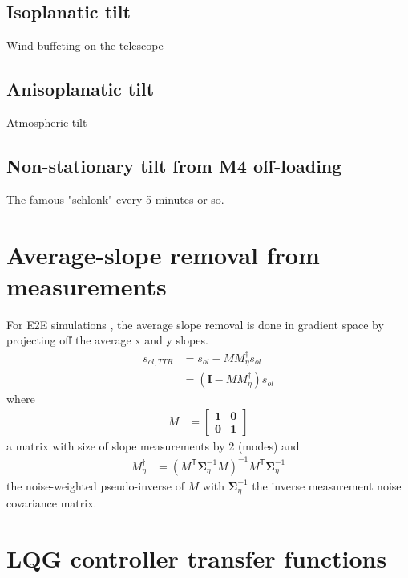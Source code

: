 \documentclass[a4paper,12pt]{article}
\newcommand{\T}{\mathsf{T}} %
\newcommand{\0}{\mathsf{0}} %
\newcommand{\I}{\mathbf{I}} %
\newcommand{\CovMat}{\boldsymbol{\Sigma}} %
\begin{document}
\subsection{Isoplanatic tilt}
Wind buffeting on the telescope

\subsection{Anisoplanatic tilt}
Atmospheric tilt

\subsection{Non-stationary tilt from M4 off-loading}
The famous "schlonk" every 5 minutes or so.
\appendix

\section{Average-slope removal from measurements}
For E2E simulations , the average slope removal is done in gradient space by projecting off
the average x and y slopes. 
\begin{align}
{s}_{ol,TTR} & = s_{ol} - MM_\eta^\dag  s_{ol}\\
             & = (\I - MM_\eta^\dag)  s_{ol}
\end{align}
where 
\begin{align}
M & = \left[\begin{array}{ll}
\mathbf 1 & \mathbf 0\\
\mathbf 0  & \mathbf 1
\end{array}\right]
\end{align}
a matrix with size of slope measurements by 2 (modes) and
\begin{align}
M_\eta^\dag & = (M^\T \CovMat_\eta^{-1} M)^{-1}M^\T \CovMat_\eta^{-1}
\end{align}
the noise-weighted pseudo-inverse of $M$ with $ \CovMat_\eta^{-1}$ the
inverse measurement noise covariance matrix.


        \section{LQG controller transfer functions}\label{sec:fonct-de-transf-LQG}
\end{document}
